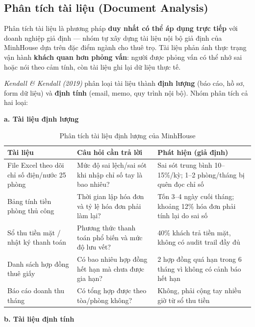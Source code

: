 \documentclass[12pt,a4paper]{report}
\begin{document}
\subsection{Phân tích tài liệu (Document Analysis)}

Phân tích tài liệu là phương pháp \textbf{duy nhất có thể áp dụng trực tiếp} với doanh nghiệp giả định --- nhóm tự xây dựng tài liệu nội bộ giả định của MinhHouse dựa trên đặc điểm ngành cho thuê trọ. Tài liệu phản ánh thực trạng vận hành \textbf{khách quan hơn phỏng vấn}: người được phỏng vấn có thể nhớ sai hoặc nói theo cảm tính, còn tài liệu ghi lại dữ liệu thực tế.

\emph{Kendall \& Kendall (2019)} phân loại tài liệu thành \textbf{định lượng} (báo cáo, hồ sơ, form dữ liệu) và \textbf{định tính} (email, memo, quy trình nội bộ). Nhóm phân tích cả hai loại:

\noindent\textbf{a. Tài liệu định lượng}

\begin{table}[H]
  \centering
  \caption{Phân tích tài liệu định lượng của MinhHouse}
  \label{tab:ig_doc_quant}
  \begin{tabular}{@{}p{4.2cm}p{4.6cm}p{5.2cm}@{}}
    \toprule
    \textbf{Tài liệu} & \textbf{Câu hỏi cần trả lời} & \textbf{Phát hiện (giả định)} \\
    \midrule
    File Excel theo dõi chỉ số điện/nước 25 phòng & Mức độ sai lệch/sai sót khi nhập chỉ số tay là bao nhiêu? & Sai sót trung bình 10--15\%/kỳ; 1--2 phòng/tháng bị quên đọc chỉ số \\
    \addlinespace
    Bảng tính tiền phòng thủ công & Thời gian lập hóa đơn và tỷ lệ hóa đơn phải làm lại? & Tốn 3--4 ngày cuối tháng; khoảng 12\% hóa đơn phải tính lại do sai số \\
    \addlinespace
    Sổ thu tiền mặt / nhật ký thanh toán & Phương thức thanh toán phổ biến và mức độ lưu vết? & 40\% khách trả tiền mặt, không có audit trail đầy đủ \\
    \addlinespace
    Danh sách hợp đồng thuê giấy & Có bao nhiêu hợp đồng hết hạn mà chưa được gia hạn? & 2 hợp đồng quá hạn trong 6 tháng vì không có cảnh báo hết hạn \\
    \addlinespace
    Báo cáo doanh thu tháng & Có tổng hợp được theo tòa/phòng không? & Không, phải cộng tay nhiều giờ từ sổ thu tiền \\
    \bottomrule
  \end{tabular}
\end{table}

\noindent\textbf{b. Tài liệu định tính}
\end{document}
